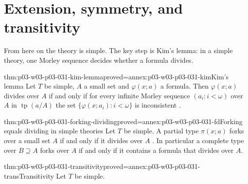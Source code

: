 \section{Extension, symmetry, and transitivity}
\label{sec:p03-w03-p03-031-simple}

From here on the theory is simple.  The key step is Kim's lemma: in a
simple theory, one Morley sequence decides whether a formula divides.

\begin{hbtheorem}{thm:p03-w03-p03-031-kim-lemma}{proved=annex:p03-w03-p03-031-kim}{Kim's lemma}
Let \(T\) be simple, \(A\) a small set and \(\varphi(x;a)\) a formula.
Then \(\varphi(x;a)\) divides over \(A\) if and only if for every infinite
Morley sequence \((a_i:i<\omega)\) over \(A\) in
\(\operatorname{tp}(a/A)\) the set \(\{\varphi(x;a_i):i<\omega\}\) is
inconsistent \cite[Proposition~5.3, p.~272]{Casanovas2007Simplicity}.
\end{hbtheorem}

\begin{hbtheorem}{thm:p03-w03-p03-031-forking-dividing}{proved=annex:p03-w03-p03-031-fd}{Forking equals dividing in simple theories}
Let \(T\) be simple.  A partial type \(\pi(x;a)\) forks over a small set
\(A\) if and only if it divides over \(A\)
\cite[Proposition~5.4, p.~272]{Casanovas2007Simplicity}.  In particular a
complete type over \(B\supseteq A\) forks over \(A\) if and only if it
contains a formula that divides over \(A\).
\end{hbtheorem}


\begin{hbtheorem}{thm:p03-w03-p03-031-transitivity}{proved=annex:p03-w03-p03-031-trans}{Transitivity}
Let \(T\) be simple.
\end{hbtheorem}

